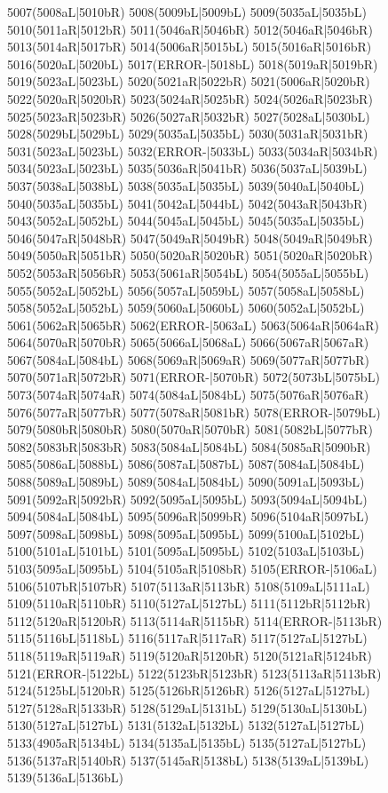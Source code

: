 5007(5008aL|5010bR) 5008(5009bL|5009bL) 5009(5035aL|5035bL) 5010(5011aR|5012bR) 5011(5046aR|5046bR) 5012(5046aR|5046bR) \\5013(5014aR|5017bR) 5014(5006aR|5015bL) 5015(5016aR|5016bR) 5016(5020aL|5020bL) 5017(ERROR-|5018bL) 5018(5019aR|5019bR) 5019(5023aL|5023bL) 5020(5021aR|5022bR) 5021(5006aR|5020bR) \\5022(5020aR|5020bR) 5023(5024aR|5025bR) 5024(5026aR|5023bR) 5025(5023aR|5023bR) 5026(5027aR|5032bR) 5027(5028aL|5030bL) 5028(5029bL|5029bL) 5029(5035aL|5035bL) 5030(5031aR|5031bR) \\5031(5023aL|5023bL) 5032(ERROR-|5033bL) 5033(5034aR|5034bR) 5034(5023aL|5023bL) 5035(5036aR|5041bR) 5036(5037aL|5039bL) 5037(5038aL|5038bL) 5038(5035aL|5035bL) 5039(5040aL|5040bL) \\5040(5035aL|5035bL) 5041(5042aL|5044bL) 5042(5043aR|5043bR) 5043(5052aL|5052bL) 5044(5045aL|5045bL) 5045(5035aL|5035bL) 5046(5047aR|5048bR) 5047(5049aR|5049bR) 5048(5049aR|5049bR) \\5049(5050aR|5051bR) 5050(5020aR|5020bR) 5051(5020aR|5020bR) 5052(5053aR|5056bR) 5053(5061aR|5054bL) 5054(5055aL|5055bL) 5055(5052aL|5052bL) 5056(5057aL|5059bL) 5057(5058aL|5058bL) \\5058(5052aL|5052bL) 5059(5060aL|5060bL) 5060(5052aL|5052bL) 5061(5062aR|5065bR) 5062(ERROR-|5063aL) 5063(5064aR|5064aR) 5064(5070aR|5070bR) 5065(5066aL|5068aL) 5066(5067aR|5067aR) \\5067(5084aL|5084bL) 5068(5069aR|5069aR) 5069(5077aR|5077bR) 5070(5071aR|5072bR) 5071(ERROR-|5070bR) 5072(5073bL|5075bL) 5073(5074aR|5074aR) 5074(5084aL|5084bL) 5075(5076aR|5076aR) \\5076(5077aR|5077bR) 5077(5078aR|5081bR) 5078(ERROR-|5079bL) 5079(5080bR|5080bR) 5080(5070aR|5070bR) 5081(5082bL|5077bR) 5082(5083bR|5083bR) 5083(5084aL|5084bL) 5084(5085aR|5090bR) \\5085(5086aL|5088bL) 5086(5087aL|5087bL) 5087(5084aL|5084bL) 5088(5089aL|5089bL) 5089(5084aL|5084bL) 5090(5091aL|5093bL) 5091(5092aR|5092bR) 5092(5095aL|5095bL) 5093(5094aL|5094bL) \\5094(5084aL|5084bL) 5095(5096aR|5099bR) 5096(5104aR|5097bL) 5097(5098aL|5098bL) 5098(5095aL|5095bL) 5099(5100aL|5102bL) 5100(5101aL|5101bL) 5101(5095aL|5095bL) 5102(5103aL|5103bL) \\5103(5095aL|5095bL) 5104(5105aR|5108bR) 5105(ERROR-|5106aL) 5106(5107bR|5107bR) 5107(5113aR|5113bR) 5108(5109aL|5111aL) 5109(5110aR|5110bR) 5110(5127aL|5127bL) 5111(5112bR|5112bR) \\5112(5120aR|5120bR) 5113(5114aR|5115bR) 5114(ERROR-|5113bR) 5115(5116bL|5118bL) 5116(5117aR|5117aR) 5117(5127aL|5127bL) 5118(5119aR|5119aR) 5119(5120aR|5120bR) 5120(5121aR|5124bR) \\5121(ERROR-|5122bL) 5122(5123bR|5123bR) 5123(5113aR|5113bR) 5124(5125bL|5120bR) 5125(5126bR|5126bR) 5126(5127aL|5127bL) 5127(5128aR|5133bR) 5128(5129aL|5131bL) 5129(5130aL|5130bL) \\5130(5127aL|5127bL) 5131(5132aL|5132bL) 5132(5127aL|5127bL) 5133(4905aR|5134bL) 5134(5135aL|5135bL) 5135(5127aL|5127bL) 5136(5137aR|5140bR) 5137(5145aR|5138bL) 5138(5139aL|5139bL) \\5139(5136aL|5136bL) 